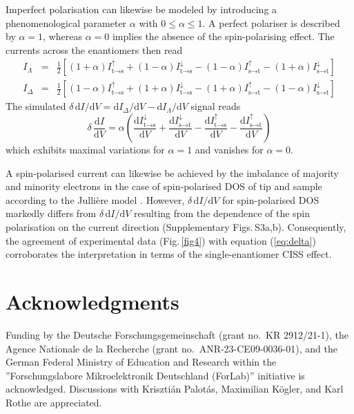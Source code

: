 \documentclass[aps,floatfix,12pt]{revtex4-2}
\begin{document}
Imperfect polarisation can likewise be modeled by introducing a phenomenological parameter $\alpha$ with $0\leq\alpha\leq 1$\@.
A perfect polariser is described by $\alpha=1$, whereas $\alpha=0$ implies the absence of the spin-polarising effect.
The currents across the enantiomers then read
\begin{eqnarray}
I_{\Lambda}&=& \frac{1}{2} \left[ (1+\alpha) I^{\uparrow}_{\text{t}\rightarrow\text{s}}+(1-\alpha)I^{\downarrow}_{\text{t}\rightarrow\text{s}}-(1-\alpha)I^{\uparrow}_{\text{s}\rightarrow\text{t}}-(1+\alpha) I^{\downarrow}_{\text{s}\rightarrow\text{t}} \right] \\
I_{\Delta}&=& \frac{1}{2} \left[ (1-\alpha)I^{\uparrow}_{\text{t}\rightarrow\text{s}}+(1+\alpha) I^{\downarrow}_{\text{t}\rightarrow\text{s}}-(1+\alpha) I^{\uparrow}_{\text{s}\rightarrow\text{t}}-(1-\alpha)I^{\downarrow}_{\text{s}\rightarrow\text{t}}\right]
\end{eqnarray}
The simulated $\delta\,\text{d}I/\text{d}V=\text{d}I_{\Delta}/\text{d}V-\text{d}I_{\Lambda}/\text{d}V$ signal reads
\begin{equation}
\delta\,\frac{\text{d}I}{\text{d}V}=\alpha\left(\frac{\text{d}I^{\downarrow}_{\text{t}\rightarrow\text{s}}}{\text{d}V}+\frac{\text{d}I^{\downarrow}_{\text{s}\rightarrow\text{t}}}{\text{d}V}-\frac{\text{d}I^{\uparrow}_{\text{t}\rightarrow\text{s}}}{\text{d}V}-\frac{\text{d}I^{\uparrow}_{\text{s}\rightarrow\text{t}}}{\text{d}V}\right)
\label{eq:delta}
\end{equation}
which exhibits maximal variations for $\alpha=1$ and vanishes for $\alpha=0$\@.

A spin-polarised current can likewise be achieved by the imbalance of majority and minority electrons in the case of spin-polarised DOS of tip and sample according to the Jullière model \cite{pla_54_225}.
However, $\delta\,\text{d}I/\text{d}V$ for spin-polarised DOS markedly differs from $\delta\,\text{d}I/\text{d}V$ resulting from the dependence of the spin polarisation on the current direction (Supplementary Figs.\,S3a,b)\@.
Consequently, the agreement of experimental data (Fig.\,\ref{fig4}) with equation (\ref{eq:delta}) corroborates the interpretation in terms of the single-enantiomer CISS effect.

\section*{Acknowledgments}

Funding by the Deutsche Forschungsgemeinschaft (grant no.\ KR 2912/21-1), the Agence Nationale de la Recherche (grant no.\ ANR-23-CE09-0036-01), and the German Federal Ministry of Education and Research within the ''Forschungslabore Mikroelektronik Deutschland (ForLab)'' initiative is acknowledged.
Discussions with Krisztián Palotás, Maximilian Kögler, and Karl Rothe are appreciated.
\end{document}
